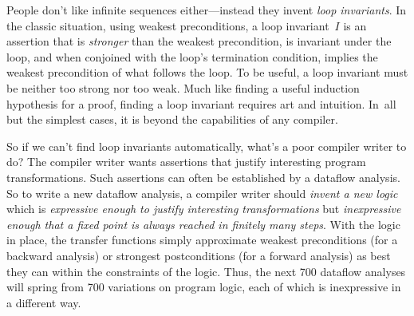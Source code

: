 \documentclass[blockstyle,preprint,nocopyrightspace]{sigplanconf}
\newcommand{\authornote}[1]{{\em #1}}
\def\authornote#1{\unskip\relax}
\newcommand{\norman}[1]{\authornote{NR: #1}}
\let\remark\norman
\begin{document}
People don't like infinite sequences either---instead they invent
\emph{loop invariants}. 
In the classic situation, using weakest preconditions, a loop
invariant~$I$ is an assertion that is \emph{stronger} than the weakest
precondition, is invariant under the loop, and when conjoined with
the loop's termination condition, implies the weakest precondition of
what follows the loop.
To be useful, a loop invariant must be neither too strong nor too
weak.
Much like finding a useful induction hypothesis for a proof, 
finding a loop invariant requires art and intuition.
In~all but the simplest cases, it is beyond the capabilities of any
compiler.



So if we can't find loop invariants automatically, what's a poor
compiler writer to do?
The compiler writer wants assertions that justify interesting program
transformations. 
Such assertions can often be established by a dataflow analysis.
So to write a new dataflow analysis, a compiler writer
should \emph{invent a new logic} which is
\emph{expressive enough to justify interesting transformations}
but \emph{inexpressive enough that a fixed point
  is always reached in finitely many steps}.
With the logic in place, the transfer functions simply approximate
  weakest preconditions (for a backward analysis) or strongest
  postconditions (for a forward analysis) as best they can within the
  constraints of the logic.
Thus, the next 700 dataflow analyses will spring from 700 variations on
program logic, each of which is inexpressive in a different way.
\remark{Do we have examples or not?}
\end{document}
